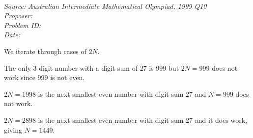   
\SSbreak\\
\emph{Source: Australian Intermediate Mathematical Olympiad, 1999 Q10}\\
\emph{Proposer: \Pbrain}\\ %
\emph{Problem ID: }\\
\emph{Date: }\\
\SSbreak

\bigskip

\begin{solution}\hfil\medskip

We iterate through cases of $2N$. \smallskip

The only 3 digit number with a digit sum of $27$ is $999$ but $2N = 999$ does not work since 999 is not even. \smallskip

$2N = 1998$ is the next smallest even number with digit sum 27 and $N = 999$ does not work. \smallskip

$2N = 2898$ is the next smallest even number with digit sum 27 and it does work, giving $N = \boxed{1449}$. 
\end{solution}\bigskip
